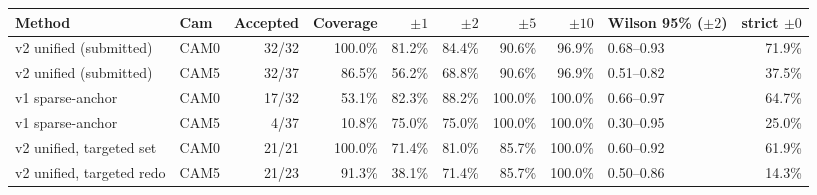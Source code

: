 \begin{tabularx}{\textwidth}{@{}llrrrrrrlr@{}}
\toprule
Method & Cam & Accepted & Coverage & $\pm1$ & $\pm2$ & $\pm5$ & $\pm10$ & Wilson 95\% ($\pm2$) & strict $\pm0$ \\
\midrule
v2 unified (submitted) & CAM0 & 32/32 & 100.0\% & 81.2\% & 84.4\% & 90.6\% & 96.9\% & 0.68--0.93 & 71.9\% \\
v2 unified (submitted) & CAM5 & 32/37 & 86.5\% & 56.2\% & 68.8\% & 90.6\% & 96.9\% & 0.51--0.82 & 37.5\% \\
v1 sparse-anchor & CAM0 & 17/32 & 53.1\% & 82.3\% & 88.2\% & 100.0\% & 100.0\% & 0.66--0.97 & 64.7\% \\
v1 sparse-anchor & CAM5 & 4/37 & 10.8\% & 75.0\% & 75.0\% & 100.0\% & 100.0\% & 0.30--0.95 & 25.0\% \\
v2 unified, targeted set & CAM0 & 21/21 & 100.0\% & 71.4\% & 81.0\% & 85.7\% & 100.0\% & 0.60--0.92 & 61.9\% \\
v2 unified, targeted redo & CAM5 & 21/23 & 91.3\% & 38.1\% & 71.4\% & 85.7\% & 100.0\% & 0.50--0.86 & 14.3\% \\
\bottomrule
\end{tabularx}